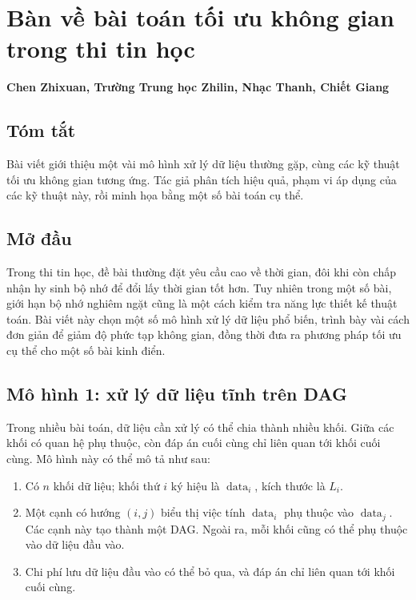 \documentclass[11pt]{article}
\begin{document}
\section{Bàn về bài toán tối ưu không gian trong thi tin học}

\begin{center}
\textbf{Chen Zhixuan, Trường Trung học Zhilin, Nhạc Thanh, Chiết Giang}
\end{center}

\subsection*{Tóm tắt}

Bài viết giới thiệu một vài mô hình xử lý dữ liệu thường gặp, cùng các kỹ thuật
tối ưu không gian tương ứng. Tác giả phân tích hiệu quả, phạm vi áp dụng của
các kỹ thuật này, rồi minh họa bằng một số bài toán cụ thể.

\subsection{Mở đầu}

Trong thi tin học, đề bài thường đặt yêu cầu cao về thời gian, đôi khi còn chấp
nhận hy sinh bộ nhớ để đổi lấy thời gian tốt hơn. Tuy nhiên trong một số bài,
giới hạn bộ nhớ nghiêm ngặt cũng là một cách kiểm tra năng lực thiết kế thuật
toán. Bài viết này chọn một số mô hình xử lý dữ liệu phổ biến, trình bày vài
cách đơn giản để giảm độ phức tạp không gian, đồng thời đưa ra phương pháp tối
ưu cụ thể cho một số bài kinh điển.

\subsection{Mô hình 1: xử lý dữ liệu tĩnh trên DAG}

Trong nhiều bài toán, dữ liệu cần xử lý có thể chia thành nhiều khối. Giữa các
khối có quan hệ phụ thuộc, còn đáp án cuối cùng chỉ liên quan tới khối cuối
cùng. Mô hình này có thể mô tả như sau:
\begin{enumerate}
  \item Có $n$ khối dữ liệu; khối thứ $i$ ký hiệu là $\operatorname{data}_i$,
  kích thước là $L_i$.
  \item Một cạnh có hướng $(i,j)$ biểu thị việc tính $\operatorname{data}_i$
  phụ thuộc vào $\operatorname{data}_j$. Các cạnh này tạo thành một DAG. Ngoài
  ra, mỗi khối cũng có thể phụ thuộc vào dữ liệu đầu vào.
  \item Chi phí lưu dữ liệu đầu vào có thể bỏ qua, và đáp án chỉ liên quan tới
  khối cuối cùng.
\end{enumerate}
\end{document}
